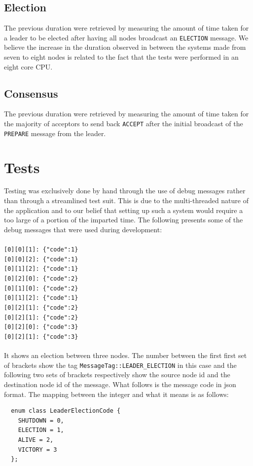 \documentclass[11pt]{article}
\begin{document}
\subsection{Election}
The previous duration were retrieved by measuring the amount of time taken for a
leader to be elected after having all nodes broadcast an \texttt{ELECTION}
message. We believe the increase in the duration observed in between the
systems made from seven to eight nodes is related to the fact that the tests
were performed in an eight core CPU.
\subsection{Consensus}
The previous duration were retrieved by measuring the amount of time taken for
the majority of acceptors to send back \texttt{ACCEPT} after the initial
broadcast of the \texttt{PREPARE} message from the leader.
\section{Tests}
Testing was exclusively done by hand through the use of debug messages rather
than through a streamlined test suit. This is due to the multi-threaded nature of
the application and to our belief that setting up such a system would require a
too large of a portion of the imparted time. The following presents some of the
debug messages that were used during development:\\\\
\texttt{[0][0][1]: \{"code":1\}}\\
\texttt{[0][0][2]: \{"code":1\}}\\
\texttt{[0][1][2]: \{"code":1\}}\\
\texttt{[0][2][0]: \{"code":2\}}\\
\texttt{[0][1][0]: \{"code":2\}}\\
\texttt{[0][1][2]: \{"code":1\}}\\
\texttt{[0][2][1]: \{"code":2\}}\\
\texttt{[0][2][1]: \{"code":2\}}\\
\texttt{[0][2][0]: \{"code":3\}}\\
\texttt{[0][2][1]: \{"code":3\}}\\\\
It shows an election between three nodes. The number between the first first set
of brackets show the tag \texttt{MessageTag::LEADER\_ELECTION} in this case and
the following two sets of brackets respectively show the source node id and the
destination node id of the message. What follows is the message code in json
format. The mapping between the integer and what it means is as follows:
\begin{verbatim}
  enum class LeaderElectionCode {
    SHUTDOWN = 0,
    ELECTION = 1,
    ALIVE = 2,
    VICTORY = 3
  };
\end{verbatim}
\end{document}
